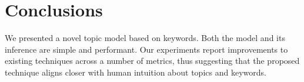 \documentclass[twocolumn,10]{article}
\newcommand{\ci}{~\cite} \newcommand{\re}{~\ref} \newcommand{\ma}{\mathbb}
\begin{document}
	\section{Conclusions} \label{sec:lim}
	We presented a novel topic model based on keywords. Both the model and its inference are simple and performant. Our experiments report improvements to existing techniques across a number of metrics, thus suggesting that the proposed technique aligns closer with human intuition about topics and keywords.
	
\end{document}

